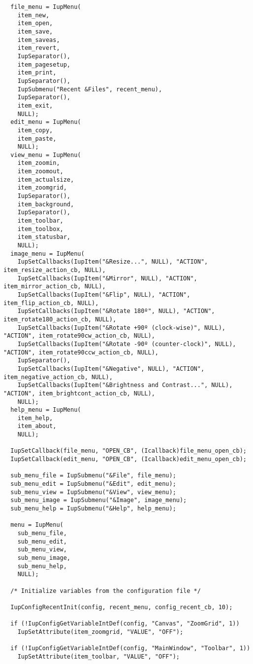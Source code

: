 \documentclass{ctexart}
\begin{document}
\begin{lstlisting}
  file_menu = IupMenu(
    item_new,
    item_open,
    item_save,
    item_saveas,
    item_revert,
    IupSeparator(),
    item_pagesetup,
    item_print,
    IupSeparator(),
    IupSubmenu("Recent &Files", recent_menu),
    IupSeparator(),
    item_exit,
    NULL);
  edit_menu = IupMenu(
    item_copy,
    item_paste,
    NULL);
  view_menu = IupMenu(
    item_zoomin,
    item_zoomout,
    item_actualsize,
    item_zoomgrid,
    IupSeparator(),
    item_background,
    IupSeparator(),
    item_toolbar,
    item_toolbox,
    item_statusbar,
    NULL);
  image_menu = IupMenu(
    IupSetCallbacks(IupItem("&Resize...", NULL), "ACTION", item_resize_action_cb, NULL),
    IupSetCallbacks(IupItem("&Mirror", NULL), "ACTION", item_mirror_action_cb, NULL),
    IupSetCallbacks(IupItem("&Flip", NULL), "ACTION", item_flip_action_cb, NULL),
    IupSetCallbacks(IupItem("&Rotate 180º", NULL), "ACTION", item_rotate180_action_cb, NULL),
    IupSetCallbacks(IupItem("&Rotate +90º (clock-wise)", NULL), "ACTION", item_rotate90cw_action_cb, NULL),
    IupSetCallbacks(IupItem("&Rotate -90º (counter-clock)", NULL), "ACTION", item_rotate90ccw_action_cb, NULL),
    IupSeparator(),
    IupSetCallbacks(IupItem("&Negative", NULL), "ACTION", item_negative_action_cb, NULL),
    IupSetCallbacks(IupItem("&Brightness and Contrast...", NULL), "ACTION", item_brightcont_action_cb, NULL),
    NULL);
  help_menu = IupMenu(
    item_help,
    item_about,
    NULL);
  
  IupSetCallback(file_menu, "OPEN_CB", (Icallback)file_menu_open_cb);
  IupSetCallback(edit_menu, "OPEN_CB", (Icallback)edit_menu_open_cb);

  sub_menu_file = IupSubmenu("&File", file_menu);
  sub_menu_edit = IupSubmenu("&Edit", edit_menu);
  sub_menu_view = IupSubmenu("&View", view_menu);
  sub_menu_image = IupSubmenu("&Image", image_menu);
  sub_menu_help = IupSubmenu("&Help", help_menu);

  menu = IupMenu(
    sub_menu_file,
    sub_menu_edit,
    sub_menu_view,
    sub_menu_image,
    sub_menu_help,
    NULL);

  /* Initialize variables from the configuration file */

  IupConfigRecentInit(config, recent_menu, config_recent_cb, 10);

  if (!IupConfigGetVariableIntDef(config, "Canvas", "ZoomGrid", 1))
    IupSetAttribute(item_zoomgrid, "VALUE", "OFF");

  if (!IupConfigGetVariableIntDef(config, "MainWindow", "Toolbar", 1))
    IupSetAttribute(item_toolbar, "VALUE", "OFF");


\end{lstlisting}
\end{document}

